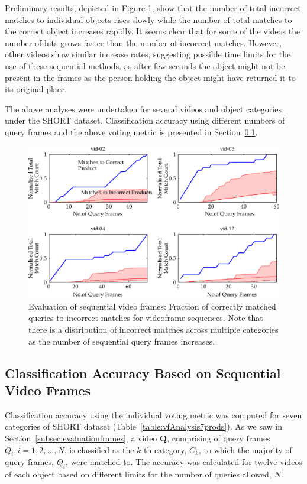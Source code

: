 Preliminary results, depicted in Figure \ref{fig:prd003b}, show that the number of total incorrect matches to individual objects rises slowly while the number of total matches to the correct object increases rapidly. It seems clear that for some of the videos the number of hits grows faster than the number of incorrect matches. However, other videos show similar increase rates, suggesting possible time limits for the use of these sequential methods. as after few seconds the object might not be present in the frames as the person holding the object might have returned it to its original place.

The above analyses were undertaken for several videos and object categories under the SHORT dataset. Classification accuracy using different numbers of query frames and the above voting metric is presented in Section~\ref{sec:expResults2}.


\begin{figure}[h!]
\centering
\includegraphics[width=\linewidth]{./gfx/Chapter03/prd0030shadedPlots-4-latex.pdf}
\caption{Evaluation of sequential video frames: Fraction of correctly matched queries to incorrect matches for videoframe sequences. Note that there is a distribution of incorrect matches across multiple categories as the number of sequential query frames increases.}        
\label{fig:prd003b}
\end{figure}


\subsection{Classification Accuracy Based on Sequential Video Frames} \label{sec:expResults2}

Classification accuracy using the individual voting metric was computed for seven categories of SHORT dataset (Table~\ref{table:vfAnalysis7prods}). As we saw in Section~\ref{subsec:evaluationframes}, a video $\mathbf{Q}$, comprising of query frames $Q_i, i = 1,2,...,N$, is classified as the $k$-th category, $C_k$, to which the majority of query frames, $Q_i$, were matched to. The accuracy was calculated for twelve videos of each object based on different limits for the number of queries allowed, $N$.

